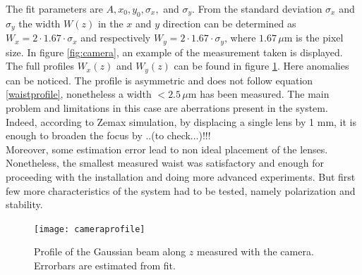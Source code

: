The fit parameters are $A,x_0,y_0,\sigma_x,$ and $\sigma_y$. From the standard deviation $\sigma_x$ and $\sigma_y$ the width $W(z)$ in the $x$ and $y$ direction can be determined as $W_x = 2\cdot 1.67\cdot \sigma_x$ and respectively $W_y = 2\cdot 1.67\cdot \sigma_y$, where $1.67\,\mu$m is the pixel size.
In figure \ref{fig:camera}, an example of the measurement taken is displayed. The full profiles $W_x(z)$ and $W_{y}(z)$ can be found in figure \ref{cameraprofile}. Here anomalies can be noticed. The profile is asymmetric and does not follow equation \ref{waistprofile}, nonetheless a width $<2.5\,\mu$m has been measured.
The main problem and limitations in this case are aberrations present in the system. Indeed, according to Zemax simulation, by displacing a single lens by 1 mm, it is enough to broaden the focus by ..(to check...)!!!\\
Moreover, some estimation error lead to non ideal placement of the lenses. Nonetheless, the smallest measured waist was satisfactory and enough for proceeding with the installation and doing more advanced experiments. But first few more characteristics of the system had to be tested, namely polarization and stability.

\begin{figure}
\centering
\texttt{[image: cameraprofile]}
\caption{Profile of the Gaussian beam along $z$ measured with the camera. Errorbars are estimated from fit.}
\label{cameraprofile}
\end{figure}

